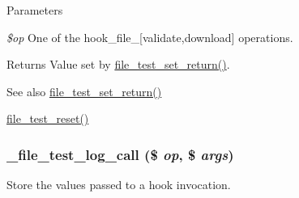 \begin{DoxyParams}{Parameters}
\item[{\em \$op}]One of the hook\_\-file\_\-\mbox{[}validate,download\mbox{]} operations.\end{DoxyParams}
\begin{DoxyReturn}{Returns}
Value set by \hyperlink{file__test_8module_a5af89506d8703c84616e6595bc088a7f}{file\_\-test\_\-set\_\-return()}.
\end{DoxyReturn}
\begin{DoxySeeAlso}{See also}
\hyperlink{file__test_8module_a5af89506d8703c84616e6595bc088a7f}{file\_\-test\_\-set\_\-return()} 

\hyperlink{file__test_8module_ac3231cdae85b5f6631a201a2f56e9d84}{file\_\-test\_\-reset()} 
\end{DoxySeeAlso}
\hypertarget{file__test_8module_a102b88df111a0197411b9b651e0ef7d5}{
\subsubsection[{\_\-file\_\-test\_\-log\_\-call}]{\setlength{\rightskip}{0pt plus 5cm}\_\-file\_\-test\_\-log\_\-call (\$ {\em op}, \/  \$ {\em args})}}
\label{file__test_8module_a102b88df111a0197411b9b651e0ef7d5}
Store the values passed to a hook invocation.


